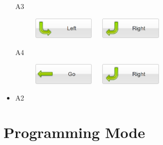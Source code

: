 \documentclass[article,A4,12pt]{llncs}
\begin{document}
\begin{enumerate}
\begin{enumerate}
\begin{figure}[!ht]
\end{figure}
\item[A3] 
\begin{figure}[!ht]
\begin{center}
\includegraphics[width=3cm]{imgk/button-left-4.png}\ \ \
\includegraphics[width=3cm]{imgk/button-right-4.png}
\end{center}
\end{figure}
\item[A4] 
\begin{figure}[!ht]
\begin{center}
\includegraphics[width=3cm]{imgk/button-go-3.png}\ \ \
\includegraphics[width=3cm]{imgk/button-right-4.png}
\end{center}
\end{figure}
\end{enumerate}
  \begin{itemize}
    \item A2
  \end{itemize}
\end{enumerate}


\section{Programming Mode}
\end{document}
